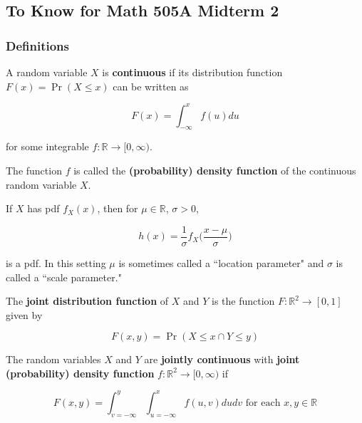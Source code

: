 \subsection{To Know for Math 505A Midterm 2}

\subsubsection{Definitions}

\begin{definition} A random variable \(X\) is \textbf{continuous} if its distribution function \(F(x) = \Pr(X \leq x)\) can be written as 

\[
F(x) = \int_{-\infty}^x f(u) du
\]

for some integrable \(f: \mathbb{R} \to [0, \infty)\). 
\end{definition}

\begin{definition} The function \(f\) is called the \textbf{(probability) density function} of the continuous random variable \(X\). \end{definition} 

\begin{proposition} If \(X\) has pdf \(f_X(x)\), then for \(\mu \in \mathbb{R}\), \(\sigma > 0\),

\[
h(x) = \frac{1}{\sigma} f_X \bigg( \frac{x - \mu}{\sigma} \bigg)
\]

is a pdf. In this setting \(\mu\) is sometimes called a ``location parameter" and \(\sigma\) is called a ``scale parameter."

\end{proposition} 

\begin{definition} The \textbf{joint distribution function} of \(X\) and \(Y\) is the function \(F: \mathbb{R}^2 \to [0, 1]\) given by

\[
F(x, y) = \Pr(X \leq x \cap Y \leq y)
\]

\end{definition}

\begin{definition}

The random variables \(X\) and \(Y\) are \textbf{jointly continuous} with \textbf{joint (probability) density function} \(f: \mathbb{R}^2 \to [0, \infty)\) if

\[
F(x, y) = \int_{v=-\infty}^y \int_{u=-\infty}^x f(u, v) du dv \text{ for each } x, y \in \mathbb{R}
\]

\end{definition}


